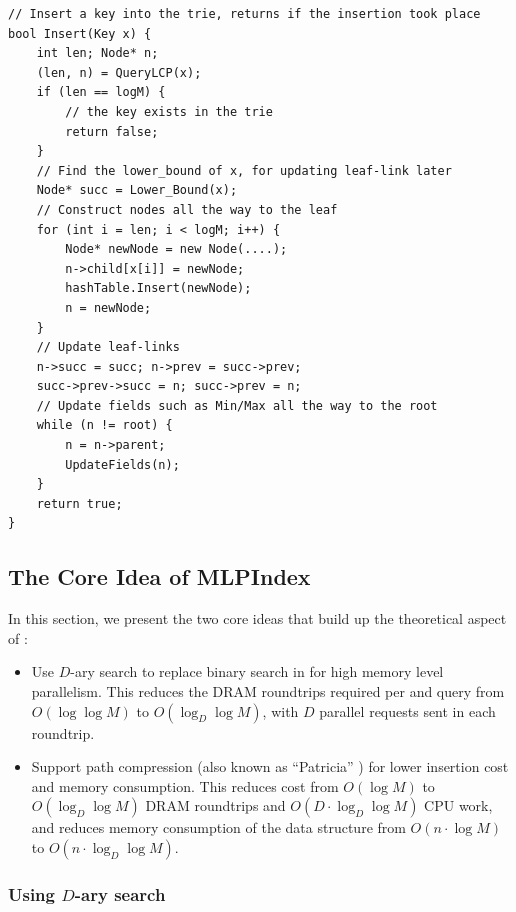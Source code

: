 \documentclass[11pt, usletter]{article}
\begin{document}
\singlespacing\begin{codebox}
\begin{verbatim}
// Insert a key into the trie, returns if the insertion took place
bool Insert(Key x) {
    int len; Node* n;
    (len, n) = QueryLCP(x);
    if (len == logM) {
        // the key exists in the trie
        return false;
    }
    // Find the lower_bound of x, for updating leaf-link later
    Node* succ = Lower_Bound(x);
    // Construct nodes all the way to the leaf
    for (int i = len; i < logM; i++) {
        Node* newNode = new Node(....);
        n->child[x[i]] = newNode;
        hashTable.Insert(newNode);
        n = newNode;
    }
    // Update leaf-links
    n->succ = succ; n->prev = succ->prev;
    succ->prev->succ = n; succ->prev = n;
    // Update fields such as Min/Max all the way to the root
    while (n != root) {
        n = n->parent;
        UpdateFields(n);
    }
    return true;
}
\end{verbatim}
\end{codebox}\doublespacing

\subsection{The Core Idea of MLPIndex} \label{mlpindex_simple}

In this section, we present the two core ideas that build up the theoretical aspect of \MlpIndex:
\begin{itemize}
[topsep=0pt,partopsep=0pt,itemsep=0pt,parsep=0pt,fullwidth,itemindent=\parindent,listparindent=\parindent]
\item Use $D$-ary search to replace binary search in \QueryLCP for high memory level parallelism.
This reduces the DRAM roundtrips required per \lookup and \lowerbound query from $O(\log\log M)$ to $O(\log_D\log M)$, 
with $D$ parallel requests sent in each roundtrip.
\item Support path compression (also known as ``Patricia'' \cite{patricia}) for lower insertion cost and memory consumption. 
This reduces \insertion cost from $O(\log M)$ to $O(\log_D\log M)$ DRAM roundtrips and $O(D\cdot \log_D\log M)$ CPU work, 
and reduces memory consumption of the data structure from $O(n\cdot\log M)$ to $O(n\cdot\log_D\log M)$.
\end{itemize}

\subsubsection*{Using $D$-ary search}
\end{document}
